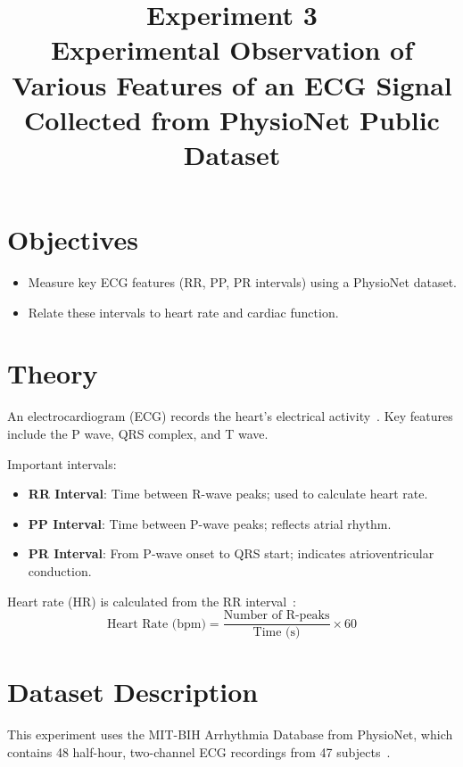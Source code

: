 \documentclass[a4paper,11pt]{article}
\title{Experiment 3 \\
    \textbf{Experimental Observation of Various Features of an ECG Signal Collected from PhysioNet Public Dataset}}
\author{}
\date{}
\begin{document}


\pagebreak
\maketitle

\vspace{-6em}

\section*{Objectives}
\begin{itemize}
    \item Measure key ECG features (RR, PP, PR intervals) using a PhysioNet dataset.
    \item Relate these intervals to heart rate and cardiac function.
\end{itemize}

\vspace{-.8em}

\section*{Theory}
An electrocardiogram (ECG) records the heart's electrical activity~\cite{ecgbook}. Key features include the P wave, QRS complex, and T wave.

Important intervals:
\begin{itemize}
    \item \textbf{RR Interval}: Time between R-wave peaks; used to calculate heart rate.
    \item \textbf{PP Interval}: Time between P-wave peaks; reflects atrial rhythm.
    \item \textbf{PR Interval}: From P-wave onset to QRS start; indicates atrioventricular conduction.
\end{itemize}

Heart rate (HR) is calculated from the RR interval~\cite{ecgbook}:
\[
    \text{Heart Rate (bpm)} = \frac{\text{Number of R-peaks}}{\text{Time (s)}} \times 60
\]

\vspace{-.8em}

\section*{Dataset Description}
This experiment uses the MIT-BIH Arrhythmia Database from PhysioNet, which contains 48 half-hour, two-channel ECG recordings from 47 subjects~\cite{mitbih}.
\end{document}
